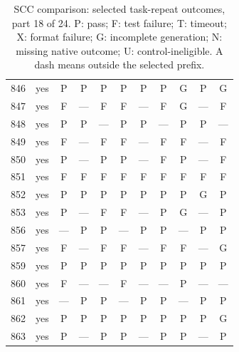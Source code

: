 \begin{table}[p]
\begin{tabular*}{\textwidth}{@{\extracolsep{\fill}}rc*{9}{c}@{}}
846 & yes & P & P & P & P & P & P & G & P & G\\
847 & yes & F & — & F & F & — & F & G & — & F\\
848 & yes & P & P & — & P & P & — & P & P & —\\
849 & yes & F & — & F & F & — & F & F & — & F\\
850 & yes & P & — & P & P & — & F & P & — & F\\
851 & yes & F & F & F & F & F & F & F & F & F\\
852 & yes & P & P & P & P & P & P & P & G & P\\
853 & yes & P & — & F & F & — & P & G & — & P\\
856 & yes & — & P & P & — & P & P & — & P & P\\
857 & yes & F & — & F & F & — & F & F & — & G\\
859 & yes & P & P & P & P & P & P & P & P & P\\
860 & yes & F & — & — & F & — & — & P & — & —\\
861 & yes & — & P & P & — & P & P & — & P & P\\
862 & yes & P & P & P & P & P & P & P & P & G\\
863 & yes & P & — & P & P & — & P & P & — & P\\
\bottomrule\end{tabular*}
\caption{SCC comparison: selected task-repeat outcomes, part 18 of 24. P: pass; F: test failure; T: timeout; X: format failure; G: incomplete generation; N: missing native outcome; U: control-ineligible. A dash means outside the selected prefix.}
\end{table}
\clearpage
